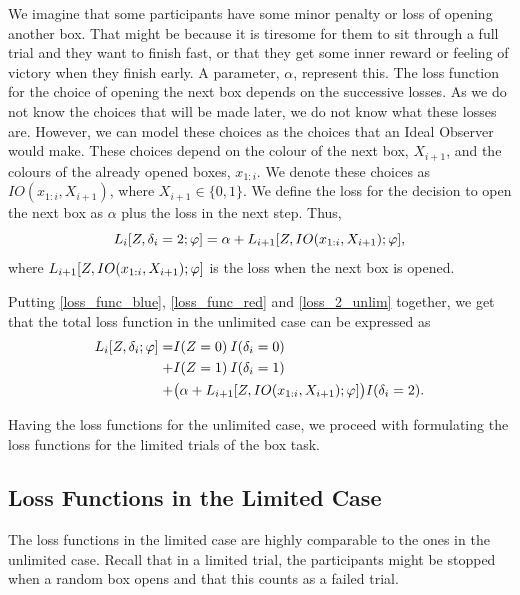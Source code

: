 We imagine that some participants have some minor penalty or loss of opening another box. That might be because it is tiresome for them to sit through a full trial and they want to finish fast, or that they get some inner reward or feeling of victory when they finish early. A parameter, $\alpha$, represent this. 
The loss function for the choice of opening the next box depends on the successive losses. As we do not know the choices that will be made later, we do not know what these losses are. However, we can model these choices as the choices that an Ideal Observer would make. These choices depend on the colour of the next box, $X_{i+1}$, and the colours of the already opened boxes, $x_{1:i}$. We denote these choices as $IO(x_{1:i},X_{i+1})$, where $X_{i+1} \in \{0,1\}$.
We define the loss for the decision to open the next box as $\alpha$ plus the loss in the next step. Thus, 
\begin{equation}
\label{loss_2_unlim}
    L_i[Z,\delta_i=2;\varphi] = \alpha + L_{i+1}[Z,IO(x_{1:i},X_{i+1});\varphi],
\end{equation}
where $L_{i+1}[Z,IO(x_{1:i},X_{i+1});\varphi]$ is the loss when the next box is opened. 


Putting \eqref{loss_func_blue}, \eqref{loss_func_red} and \eqref{loss_2_unlim} together, we get that the total loss function in the unlimited case can be expressed as
\begin{equation}
\label{tot_loss_unlim}
    \begin{aligned}
       L_i[Z,\delta_{i};\varphi] 
       =& I(Z=0)\: I(\delta_i=0) \\
       +& I(Z=1)\: I(\delta_i=1)\\
       +& \big(\alpha + L_{i+1}[Z,IO(x_{1:i},X_{i+1});\varphi] \big) I(\delta_i=2).
    \end{aligned}
\end{equation}

Having the loss functions for the unlimited case, we proceed with formulating the loss functions for the limited trials of the box task. 




\subsection{Loss Functions in the Limited Case}
The loss functions in the limited case are highly comparable to the ones in the unlimited case. Recall that in a limited trial, the participants might be stopped when a random box opens and that this counts as a failed trial. 

